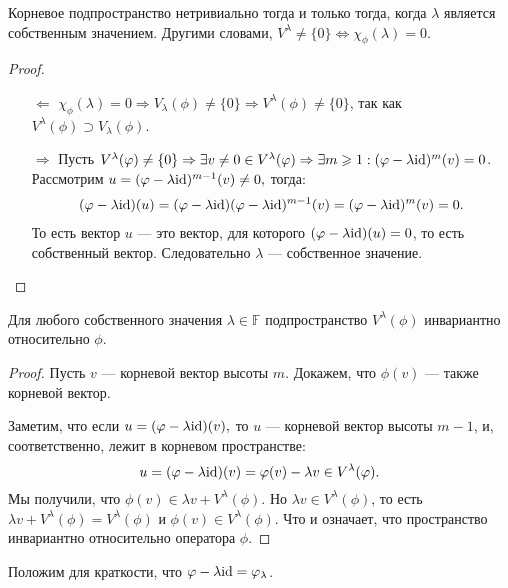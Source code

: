 \begin{Suggestion}
	Корневое подпространство нетривиально тогда и только тогда, когда $\lambda$ является собственным значением. Другими словами, $V^{\lambda} \neq \{0\} 	
	\Leftrightarrow \chi_{\phi}(\lambda) = 0.$
\end{Suggestion}
\begin{proof}\
	\begin{itemize}
		\item[$\Leftarrow$]
		$\chi_{\phi}(\lambda) = 0 \Rightarrow V_{\lambda}(\phi) \neq \{0\} \Rightarrow V^{\lambda}(\phi) \neq \{0\}$, так как $V^{\lambda}(\phi) \supset V_{\lambda}(\phi)$.
		\item[$\Rightarrow$]
		Пусть $V^{\lambda}(\varphi) \neq \{0\} \Rightarrow \exists v \neq 0 \in V^{\lambda}(\varphi) \Rightarrow \exists m \geqslant 1: (\varphi - \lambda \mathrm{id})^{m}(v) = 0$. \\
		Рассмотрим $u = (\varphi - \lambda \mathrm{id})^{m - 1}(v) \neq 0,$ тогда:
		\begin{gather*}
		(\varphi - \lambda \mathrm{id})(u) = (\varphi - \lambda \mathrm{id})(\varphi - \lambda \mathrm{id})^{m - 1}(v) = (\varphi - \lambda \mathrm{id})^{m}(v) = 0.
		\end{gather*}
		То есть вектор $u$ --- это вектор, для которого $(\varphi - \lambda \mathrm{id})(u) = 0$, то есть собственный вектор. Следовательно $\lambda$ --- собственное значение.
	\end{itemize}
\end{proof}
\begin{Suggestion}
	Для любого собственного значения $\lambda \in \mathbb{F}$ подпространство $V^{\lambda}(\phi)$ инвариантно относительно $\phi$.
\end{Suggestion}
\begin{proof}
	Пусть $v$ --- корневой вектор высоты $m$. Докажем, что $\phi(v)$ --- также корневой вектор. 
	
	Заметим, что если $u = (\varphi - \lambda \mathrm{id})(v),$ то $u$ --- корневой вектор высоты $m - 1$, и, соответственно, лежит в корневом пространстве:
	$$
	u = (\varphi - \lambda \mathrm{id})(v) = \varphi(v) - \lambda{v} \in V^{\lambda}(\varphi).
	$$
	Мы получили, что 
	$\phi(v) \in \lambda{v} + V^{\lambda}(\phi).$ 
	Но $\lambda{v} \in V^{\lambda}(\phi)$, то есть $\lambda{v} + V^{\lambda}(\phi) = V^{\lambda}(\phi)$ и $\phi(v) \in V^{\lambda}(\phi)$. Что и означает, что пространство инвариантно относительно оператора $\phi$.
\end{proof}
Положим для краткости, что $\varphi - \lambda \mathrm{id} = \varphi_{\lambda}$.

